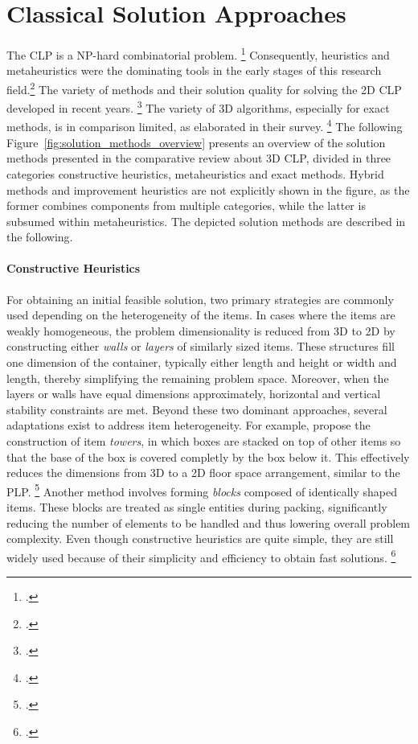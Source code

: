\chapter{Classical Solution Approaches}
\label{sec:classical_solution_approaches}
The \gls{CLP} is a NP-hard combinatorial problem. \footcite[cf.][p. 11]{bortfeldt_constraints_2013}
Consequently, heuristics and metaheuristics were the dominating tools
in the early stages of this research field.\footcite[cf.][]{pisinger_heuristics_2002} The variety of methods
and their solution quality for solving the 2D \gls{CLP} developed in recent years. \footcite[cf.][p. 23]{iori_exact_2021}
The variety of 3D algorithms, especially for exact methods, is in comparison limited, as
\citeauthor*{zhao_comparative_2016} elaborated in their survey. \footcite[cf.][]{zhao_comparative_2016}
The following Figure~\ref{fig:solution_methods_overview} presents an overview of the solution methods
presented in the comparative review about 3D \gls{CLP}, divided in three categories constructive heuristics, metaheuristics
and exact methods. Hybrid methods and improvement heuristics are not explicitly shown in the figure,
as the former combines components from multiple categories, while the latter is subsumed within
metaheuristics. The depicted solution methods are described in the following.



\subsubsection{Constructive Heuristics}
For obtaining an initial feasible solution, two primary strategies are commonly
used depending on the heterogeneity of the items. In cases where the items are weakly homogeneous,
the problem dimensionality is reduced from 3D to 2D by constructing either
\textit{walls} or \textit{layers} of similarly sized items. These structures fill one
dimension of the container, typically either length and height or width and length, thereby
simplifying the remaining problem space. Moreover, when the layers or walls have
equal dimensions approximately, horizontal and vertical stability constraints are met.
Beyond these two dominant approaches, several adaptations exist to address item heterogeneity.
For example, \citeauthor*{gehring_genetic_1997} propose the construction of item
\textit{towers}, in which boxes are stacked on top of other items so that the base of the box is covered completly
by the box below it.
This effectively reduces the dimensions from 3D to a 2D floor space arrangement,
similar to the \gls{PLP}. \footcite[cf.][pp. 402--406]{gehring_genetic_1997}
Another method involves forming \textit{blocks} composed of identically shaped items.
These blocks are treated as single entities
during packing, significantly reducing the number of elements to be handled and thus
lowering overall problem complexity. Even though constructive heuristics are quite simple,
they are still widely used because of their simplicity and efficiency to obtain fast solutions.
\footcite[cf.][pp. 11--13]{tamke_branch-and-cut_2024}

